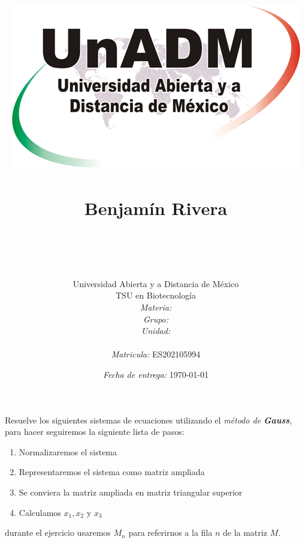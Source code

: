 \documentclass[11pt]{article}
\title{
	\includegraphics{../../../assets/logo-unadm} \\
	\ \\ Benjam\'in Rivera \\
	\bf{\titulo}\\\ \\}
\author{
	Universidad Abierta y a Distancia de México \\
	TSU en Biotecnolog\'ia \\
	\textit{Materia:} \materia \\
	\textit{Grupo:} \grupo \\
	\textit{Unidad:} \unidad \\
	\\
	\textit{Matricula:} ES202105994 }
\date{\textit{Fecha de entrega:} \today}
\begin{document}
\maketitle\newpage

	\par Resuelve los siguientes sistemas de ecuaciones utilizando el \textit{m\'etodo de \textbf{Gauss}}, para hacer seguiremos la siguiente lista de pasos:
	\begin{enumerate}
		\item Normalizaremos el sistema
		\item Representaremos el sistema como matriz ampliada
		\item Se conviera la matriz ampliada en matriz triangular superior
		\item Calculamos $x_1, x_2 \text{ y } x_3$
	\end{enumerate}
	durante el ejercicio usaremos $M_n$ para referirnos a la fila $n$ de la matriz $M$.
\end{document}
